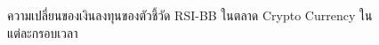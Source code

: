 \begin{figure}[!htb]
    \centering
    \caption{ความเปลี่ยนของเงินลงทุนของตัวชี้วัด RSI-BB ในตลาด Crypto Currency ในแต่ละกรอบเวลา}
    \label{fig:rsi-bb-crypto-all}
\end{figure}

